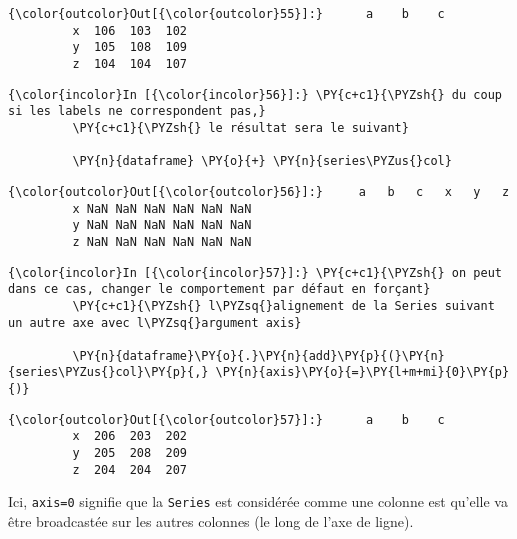 \begin{Verbatim}[commandchars=\\\{\},frame=single,framerule=0.3mm,rulecolor=\color{cellframecolor}]
{\color{outcolor}Out[{\color{outcolor}55}]:}      a    b    c
         x  106  103  102
         y  105  108  109
         z  104  104  107
\end{Verbatim}
            
    \begin{Verbatim}[commandchars=\\\{\},frame=single,framerule=0.3mm,rulecolor=\color{cellframecolor}]
{\color{incolor}In [{\color{incolor}56}]:} \PY{c+c1}{\PYZsh{} du coup si les labels ne correspondent pas,}
         \PY{c+c1}{\PYZsh{} le résultat sera le suivant}
         
         \PY{n}{dataframe} \PY{o}{+} \PY{n}{series\PYZus{}col}
\end{Verbatim}


\begin{Verbatim}[commandchars=\\\{\},frame=single,framerule=0.3mm,rulecolor=\color{cellframecolor}]
{\color{outcolor}Out[{\color{outcolor}56}]:}     a   b   c   x   y   z
         x NaN NaN NaN NaN NaN NaN
         y NaN NaN NaN NaN NaN NaN
         z NaN NaN NaN NaN NaN NaN
\end{Verbatim}
            
    \begin{Verbatim}[commandchars=\\\{\},frame=single,framerule=0.3mm,rulecolor=\color{cellframecolor}]
{\color{incolor}In [{\color{incolor}57}]:} \PY{c+c1}{\PYZsh{} on peut dans ce cas, changer le comportement par défaut en forçant}
         \PY{c+c1}{\PYZsh{} l\PYZsq{}alignement de la Series suivant un autre axe avec l\PYZsq{}argument axis}
         
         \PY{n}{dataframe}\PY{o}{.}\PY{n}{add}\PY{p}{(}\PY{n}{series\PYZus{}col}\PY{p}{,} \PY{n}{axis}\PY{o}{=}\PY{l+m+mi}{0}\PY{p}{)}
\end{Verbatim}


\begin{Verbatim}[commandchars=\\\{\},frame=single,framerule=0.3mm,rulecolor=\color{cellframecolor}]
{\color{outcolor}Out[{\color{outcolor}57}]:}      a    b    c
         x  206  203  202
         y  205  208  209
         z  204  204  207
\end{Verbatim}
            
    Ici, \texttt{axis=0} signifie que la \texttt{Series} est considérée
comme une colonne est qu'elle va être broadcastée sur les autres
colonnes (le long de l'axe de ligne).

